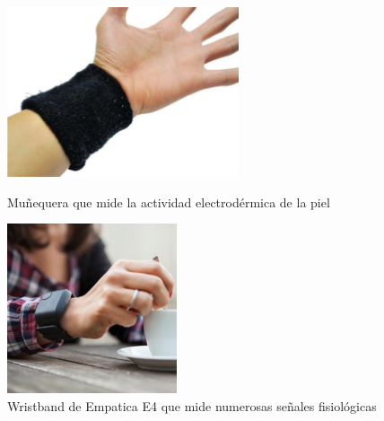 \begin{figure}[]
   \begin{minipage}{0.48\textwidth}
     \centering
     \includegraphics[width=.7\linewidth, height=5cm]{Imagenes/w5}
     \caption{Muñequera que mide la actividad electrodérmica de la piel}
     \label{fig:w5}
   \end{minipage}\hfill
   \begin {minipage}{0.48\textwidth}
     \centering
     \includegraphics[width=.7\linewidth, height=5cm]{Imagenes/w6}
     \caption{Wristband de Empatica E4 que mide numerosas señales fisiológicas}
     \label{fig:w6}
   \end{minipage}
\end{figure}

